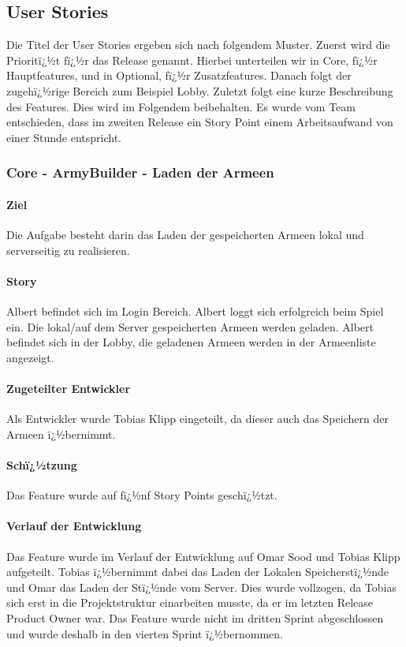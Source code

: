 \documentclass[12pt, titlepage]{scrartcl}
\begin{document}
		\subsection{User Stories}
		\label{UserStoriesSprint3}
		Die Titel der User Stories ergeben sich nach folgendem Muster. Zuerst wird die Prioritï¿½t fï¿½r das Release genannt. Hierbei unterteilen wir in \glqq Core\grqq, fï¿½r Hauptfeatures, und in \glqq Optional\grqq, fï¿½r Zusatzfeatures. Danach folgt der zugehï¿½rige Bereich zum Beispiel \glqq Lobby\grqq. Zuletzt folgt eine kurze Beschreibung des Features. Dies wird im Folgendem beibehalten. Es wurde vom Team entschieden, dass im zweiten Release ein Story Point einem Arbeitsaufwand von einer Stunde entspricht.
		
		\subsubsection{Core - ArmyBuilder - Laden der Armeen}
		\paragraph{Ziel} Die Aufgabe besteht darin das Laden der gespeicherten Armeen lokal und serverseitig zu realisieren.
		\paragraph{Story} Albert befindet sich im Login Bereich. Albert loggt sich erfolgreich beim Spiel ein. Die lokal/auf dem Server gespeicherten Armeen werden geladen. Albert befindet sich in der Lobby, die geladenen Armeen werden in der Armeenliste angezeigt.
		\paragraph{Zugeteilter Entwickler} Als Entwickler wurde Tobias Klipp eingeteilt, da dieser auch das Speichern der Armeen ï¿½bernimmt.
		\paragraph{Schï¿½tzung}
		Das Feature wurde auf fï¿½nf Story Points geschï¿½tzt.
		\paragraph{Verlauf der Entwicklung} Das Feature wurde im Verlauf der Entwicklung auf Omar Sood und Tobias Klipp aufgeteilt. Tobias ï¿½bernimmt dabei das Laden der Lokalen Speicherstï¿½nde und Omar das Laden der Stï¿½nde vom Server. Dies wurde vollzogen, da Tobias sich erst in die Projektstruktur einarbeiten musste, da er im letzten Release Product Owner war. Das Feature wurde nicht im dritten Sprint abgeschlossen und wurde deshalb in den vierten Sprint ï¿½bernommen.
		
\end{document}
